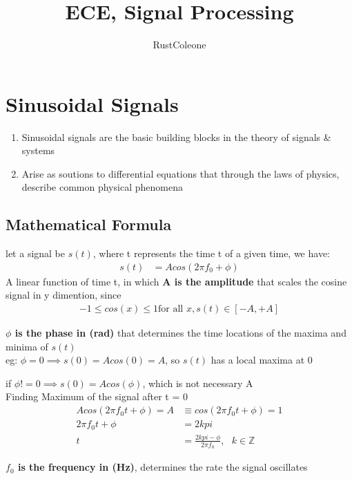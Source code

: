 \documentclass{article}
\author{RustColeone}
\title{ECE, Signal Processing}
\begin{document}
\maketitle
\newpage
\tableofcontents
\newpage
\section{Sinusoidal Signals}
    \begin{enumerate}
        \item Sinusoidal signals are the basic building blocks in the theory of signals \& systems
        \item Arise as soutions to differential equations that through the laws of physics, describe common physical phenomena
    \end{enumerate}
    \subsection{Mathematical Formula}
    let a signal be $s(t)$, where t represents the time t of a given time, we have:
    \begin{align}
        s(t) &= A cos(2 \pi f_0 + \phi)
    \end{align}
    A linear function of time t, in which \textbf{A is the amplitude} that scales the cosine signal in y dimention, since
    \begin{align}
        -1 \leq cos(x) \leq 1 \text{for all } x, s(t) \in [-A, +A]
    \end{align}

    \textbf{$\phi$ is the phase in (rad)} that determines the time locations of the maxima and minima of $s(t)$\\

    eg: $\phi = 0 \implies s(0) = Acos(0) = A$, so $s(t)$ has a local maxima at 0

    if $\phi != 0 \implies s(0) = Acos(\phi)$, which is not necessary A\\
    
    Finding Maximum of the signal after t = 0
    \begin{align}
        Acos(2 \pi f_0 t + \phi) = A &\equiv cos(2 \pi f_0 t + \phi) = 1 \\
        2 \pi f_0 t + \phi &= 2 k pi \\
        t &= \frac{2 k pi - \phi}{2 \pi f_0}, \text{ } k \in \mathbb{Z}
    \end{align}

    \textbf{$f_0$ is the frequency in (Hz)}, determines the rate the signal oscillates
    
\end{document}
